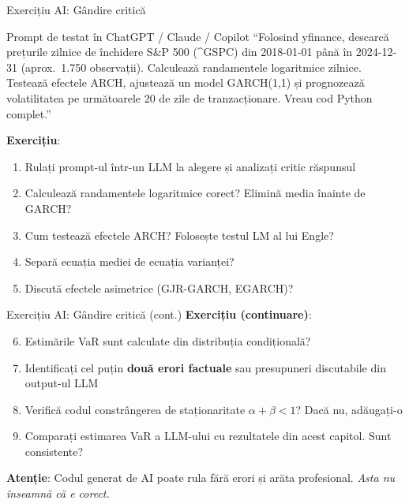 \documentclass[9pt, aspectratio=169, t]{beamer}
\begin{document}
\begin{frame}{Exercițiu AI: Gândire critică}
    \small
        \vspace{-3mm}
        \begin{block}{Prompt de testat în ChatGPT / Claude / Copilot}
            ``Folosind yfinance, descarcă prețurile zilnice de închidere S\&P 500 (\^{}GSPC) din 2018-01-01 până în 2024-12-31 (aprox.\ 1.750 observații). Calculează randamentele logaritmice zilnice. Testează efectele ARCH, ajustează un model GARCH(1,1) și prognozează volatilitatea pe următoarele 20 de zile de tranzacționare. Vreau cod Python complet.''
        \end{block}
        \vspace{-2mm}
        \textbf{Exercițiu}:
        \begin{enumerate}
            \item Rulați prompt-ul într-un LLM la alegere și analizați critic răspunsul
            \item Calculează randamentele logaritmice corect? Elimină media înainte de GARCH?
            \item Cum testează efectele ARCH? Folosește testul LM al lui Engle?
            \item Separă ecuația mediei de ecuația varianței?
            \item Discută efectele asimetrice (GJR-GARCH, EGARCH)?
        \end{enumerate}
\end{frame}

\begin{frame}{Exercițiu AI: Gândire critică (cont.)}
    \small
        \textbf{Exercițiu (continuare)}:
        \begin{enumerate}
            \setcounter{enumi}{5}
            \item Estimările VaR sunt calculate din distribuția condițională?
            \item Identificați cel puțin \textbf{două erori factuale} sau presupuneri discutabile din output-ul LLM
            \item Verifică codul constrângerea de staționaritate $\alpha + \beta < 1$? Dacă nu, adăugați-o
            \item Comparați estimarea VaR a LLM-ului cu rezultatele din acest capitol. Sunt consistente?
        \end{enumerate}
        \vspace{-2mm}
        \begin{alertblock}{}
            \textbf{Atenție}: Codul generat de AI poate rula fără erori și arăta profesional. \textit{Asta nu înseamnă că e corect.}
        \end{alertblock}
\end{frame}
\end{document}
